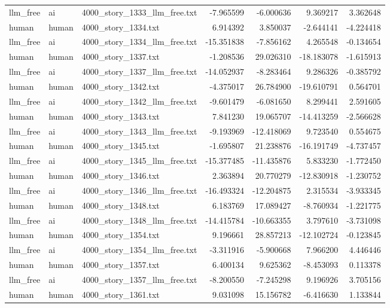 \begin{longtable}{lllrrrr}
llm\_free & ai & 4000\_story\_1333\_llm\_free.txt & -7.965599 & -6.000636 & 9.369217 & 3.362648 \\
human & human & 4000\_story\_1334.txt & 6.914392 & 3.850037 & -2.644141 & -4.224418 \\
llm\_free & ai & 4000\_story\_1334\_llm\_free.txt & -15.351838 & -7.856162 & 4.265548 & -0.134654 \\
human & human & 4000\_story\_1337.txt & -1.208536 & 29.026310 & -18.183078 & -1.615913 \\
llm\_free & ai & 4000\_story\_1337\_llm\_free.txt & -14.052937 & -8.283464 & 9.286326 & -0.385792 \\
human & human & 4000\_story\_1342.txt & -4.375017 & 26.784900 & -19.610791 & 0.564701 \\
llm\_free & ai & 4000\_story\_1342\_llm\_free.txt & -9.601479 & -6.081650 & 8.299441 & 2.591605 \\
human & human & 4000\_story\_1343.txt & 7.841230 & 19.065707 & -14.413259 & -2.566628 \\
llm\_free & ai & 4000\_story\_1343\_llm\_free.txt & -9.193969 & -12.418069 & 9.723540 & 0.554675 \\
human & human & 4000\_story\_1345.txt & -1.695807 & 21.238876 & -16.191749 & -4.737457 \\
llm\_free & ai & 4000\_story\_1345\_llm\_free.txt & -15.377485 & -11.435876 & 5.833230 & -1.772450 \\
human & human & 4000\_story\_1346.txt & 2.363894 & 20.770279 & -12.830918 & -1.230752 \\
llm\_free & ai & 4000\_story\_1346\_llm\_free.txt & -16.493324 & -12.204875 & 2.315534 & -3.933345 \\
human & human & 4000\_story\_1348.txt & 6.183769 & 17.089427 & -8.760934 & -1.221775 \\
llm\_free & ai & 4000\_story\_1348\_llm\_free.txt & -14.415784 & -10.663355 & 3.797610 & -3.731098 \\
human & human & 4000\_story\_1354.txt & 9.196661 & 28.857213 & -12.102724 & -0.123845 \\
llm\_free & ai & 4000\_story\_1354\_llm\_free.txt & -3.311916 & -5.900668 & 7.966200 & 4.446446 \\
human & human & 4000\_story\_1357.txt & 6.400134 & 9.625362 & -8.453093 & 0.113378 \\
llm\_free & ai & 4000\_story\_1357\_llm\_free.txt & -8.200550 & -7.245298 & 9.196926 & 3.705156 \\
human & human & 4000\_story\_1361.txt & 9.031098 & 15.156782 & -6.416630 & 1.133844 \\

\end{longtable}
